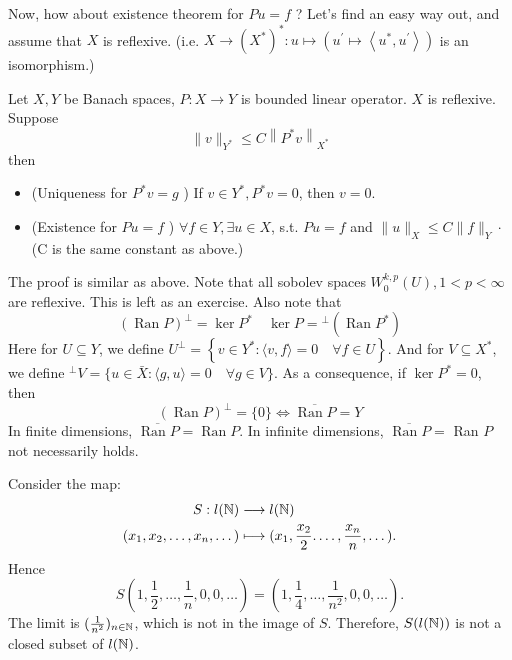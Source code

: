 Now, how about existence theorem for $P u=f$ ? Let's find an easy way out, and assume that $X$ is reflexive. (i.e. $X \rightarrow\left(X^{*}\right)^{*}: u \mapsto\left(u^{\prime} \mapsto\left\langle u^{*}, u^{\prime}\right\rangle\right)$ is an isomorphism.)

\begin{theorem}
    \label{thm: Uniqueness and Existence P*}
    Let $X, Y$ be Banach spaces, $P: X \rightarrow Y$ is bounded linear operator. $X$ is reflexive. Suppose
    $$
    \|v\|_{Y^{*}} \leq C\left\|P^{*} v\right\|_{X^{*}}
    $$
    then 
    \begin{itemize}
        \item (Uniqueness for $P^{*} v=g$ ) If $v \in Y^{*}, P^{*} v=0$, then $v=0$.
        \item (Existence for $P u=f$ ) $\forall f \in Y, \exists u \in X$, s.t. $P u=f$ and $\|u\|_{X} \leq C\|f\|_{Y} \cdot$ (C is the same constant as above.)
    \end{itemize}
\end{theorem}

The proof is similar as above. Note that all sobolev spaces $W_{0}^{k, p}(U), 1<p<\infty$ are reflexive. This is left as an exercise. Also note that
$$
(\operatorname{Ran} P)^{\perp}=\operatorname{ker} P^{*} \quad \operatorname{ker} P={ }^{\perp}\left(\operatorname{Ran} P^{*}\right)
$$
Here for $U \subseteq Y$, we define $U^{\perp}=\left\{v \in Y^{*}:\langle v, f\rangle=0 \quad \forall f \in U\right\}$. And for $V \subseteq X^{*}$, we define ${ }^{\perp} V=\{u \in \bar{X}:\langle g, u\rangle=0 \quad \forall g \in V\}$. As a consequence, if $\operatorname{ker} P^{*}=0$, then 
$$
(\operatorname{Ran} P)^{\perp}=\{0\} \Longleftrightarrow \overline{\operatorname{Ran} P}=Y
$$
In finite dimensions, $\overline{\operatorname{Ran} P}=\operatorname{Ran} P$. In infinite dimensions, $\overline{\operatorname{Ran} P}=$ Ran $P$ not necessarily holds.

\begin{example}
Consider the map: 
\begin{align*}
    S: l(\mathbb{N}) &\longrightarrow l(\mathbb{N}) \\
    (x_1,x_2,\dots, x_n,\dots) &\longmapsto (x_1, \frac{x_2}{2}.\dots, \frac{x_n}{n},\dots) 
.\end{align*}
Hence 
\[
    S(1, \frac1 2,\dots, \frac 1 n,0,0,\dots) = (1,\frac 1 4,\dots, \frac 1{n^2},0,0,\dots).
\]
The limit is $(\frac{1}{n^2})_{n\in \mathbb{N}}$, which is not in the image of $S$. Therefore, $S(l(\mathbb{N}))$ is not a closed subset of $l(\mathbb{N})$.


\end{example}

